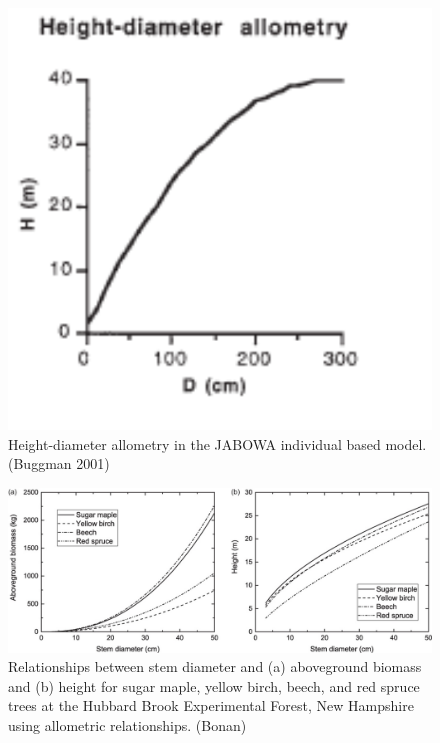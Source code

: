 \documentclass[
  12pt,
  oneside]{book}
\begin{document}
\begin{figure}

{\centering \includegraphics[width=0.8\linewidth]{figures/chap6/f620_HD_allom} 

}

\caption{Height-diameter allometry in the JABOWA individual based model.(Buggman 2001)}\label{fig:f620}
\end{figure}

\begin{figure}

{\centering \includegraphics[width=0.8\linewidth]{figures/chap6/f621_BD_allom} 

}

\caption{Relationships between stem diameter and (a) aboveground biomass and (b) height for sugar maple, yellow birch, beech, and red spruce trees at the Hubbard Brook Experimental Forest, New Hampshire using allometric relationships. (Bonan)}\label{fig:f621}
\end{figure}
\end{document}
